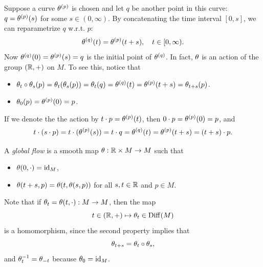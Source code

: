 Suppose a curve $\theta^{(p)}$ is chosen and let $q$ be another point in this curve: $q = \theta^{(p)}(s)$ for some $s \in (0,\infty)$. By concatenating the time interval $[0, s]$, we can reparametrize $q$ w.r.t. $p$: 
$$\theta^{(q)}(t) = \theta^{(p)}(t+s), \quad t \in [0,\infty). $$
Now $\theta^{(q)}(0) = \theta^{(p)}(s) = q$ is the initial point of $\theta^{(q)}$. In fact, $\theta$ is an action of the group $(\mathbb{R},+)$ on $M$. To see this, notice that 
\begin{itemize}
    \item $\theta_t \circ \theta_s(p) = \theta_t(\theta_s(p)) = \theta_t(q) = \theta^{(q)}(t) = \theta^{(p)}(t+s) = \theta_{t+s}(p)$.
    \item $\theta_0(p) = \theta^{(p)}(0) = p$. 
\end{itemize}
If we denote the the action by $t \cdot p = \theta^{(p)}(t)$, then 
$0 \cdot p = \theta^{(p)}(0) = p$, and 
$$t \cdot (s \cdot p) = t \cdot (\theta^{(p)}(s)) = t \cdot q = \theta^{(q)}(t) = \theta^{(p)}(t+s) = (t+s) \cdot p. $$
\begin{definition}
A \textit{global flow} is a smooth map $\theta:\mathbb{R} \times M \to M$ such that 
\begin{itemize}
    \item $\theta(0,\cdot) = \mathrm{id}_M$,
    \item $\theta(t+s,p) = \theta(t,\theta(s,p))$ for all $s,t \in \mathbb{R}$ and $p \in M$. 
\end{itemize}
\end{definition}
Note that if $\theta_t = \theta(t,\cdot):M \to M$, then the map 
$$t \in (\mathbb{R},+) \mapsto \theta_t \in \mathrm{Diff}(M)$$ is a homomorphism, since the second property implies that 
$$\theta_{t+s} = \theta_t \circ \theta_s, $$
and $\theta_t^{-1} = \theta_{-t}$ because $\theta_0 = \mathrm{id}_M$.

